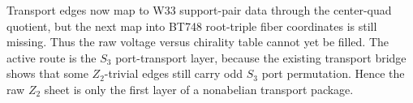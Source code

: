
\makeatletter
{}
\makeatother
\providecommand{\PSp}{\mathrm{PSp}}
\providecommand{\Aut}{\mathrm{Aut}}
\providecommand{\spec}{\operatorname{spec}}


\begin{remark}
\label{rem:correlation-block-s3-route}
Transport edges now map to W33 support-pair data through the center-quad quotient,
but the next map into BT748 root-triple fiber coordinates is still missing.  Thus
the raw voltage versus chirality table cannot yet be filled.  The active route is
the $S_3$ port-transport layer, because the existing transport bridge shows that
some $Z_2$-trivial edges still carry odd $S_3$ port permutation.  Hence the raw
$Z_2$ sheet is only the first layer of a nonabelian transport package.
\end{remark}
